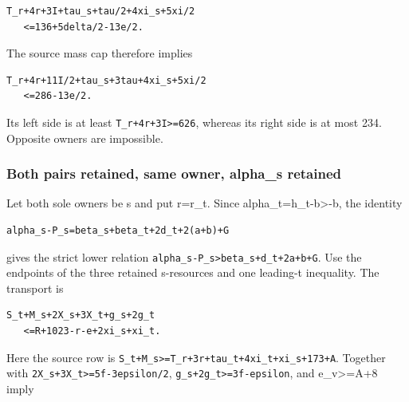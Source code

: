 \documentclass[10pt,a4paper]{article}
\theoremstyle{definition}
\begin{document}
\begin{lstlisting}
T_r+4r+3I+tau_s+tau/2+4xi_s+5xi/2
   <=136+5delta/2-13e/2.
\end{lstlisting}

The source mass cap therefore implies

\begin{lstlisting}
T_r+4r+11I/2+tau_s+3tau+4xi_s+5xi/2
   <=286-13e/2.
\end{lstlisting}

Its left side is at least \texttt{T\_\allowbreak{}\allowbreak{}r+\allowbreak{}4r+\allowbreak{}3I>=\allowbreak{}626},\allowbreak{}
whereas its right side is at most 234. Opposite owners are impossible.

\hypertarget{both-pairs-retained-same-owner-alpha_s-retained}{%
\subsubsection{Both pairs retained,\allowbreak{} same owner,\allowbreak{} alpha\_\allowbreak{}s
retained}\label{both-pairs-retained-same-owner-alpha_s-retained}}

Let both sole owners be s and put r=\allowbreak{}r\_\allowbreak{}t. Since
alpha\_\allowbreak{}t=\allowbreak{}h\_\allowbreak{}t-b\textgreater-b,\allowbreak{} the identity

\begin{lstlisting}
alpha_s-P_s=beta_s+beta_t+2d_t+2(a+b)+G
\end{lstlisting}

gives the strict lower relation
\texttt{alpha\_\allowbreak{}\allowbreak{}s-P\_\allowbreak{}\allowbreak{}s>beta\_\allowbreak{}\allowbreak{}s+\allowbreak{}d\_\allowbreak{}\allowbreak{}t+\allowbreak{}2a+\allowbreak{}b+\allowbreak{}G}. Use the
endpoints of the three retained s-resources and one leading-t
inequality. The transport is

\begin{lstlisting}
S_t+M_s+2X_s+3X_t+g_s+2g_t
   <=R+1023-r-e+2xi_s+xi_t.
\end{lstlisting}

Here the source row is
\texttt{S\_\allowbreak{}\allowbreak{}t+\allowbreak{}M\_\allowbreak{}\allowbreak{}s>=\allowbreak{}T\_\allowbreak{}\allowbreak{}r+\allowbreak{}3r+\allowbreak{}tau\_\allowbreak{}\allowbreak{}t+\allowbreak{}4xi\_\allowbreak{}\allowbreak{}t+\allowbreak{}xi\_\allowbreak{}\allowbreak{}s+\allowbreak{}173+\allowbreak{}A}.
Together with \texttt{2X\_\allowbreak{}\allowbreak{}s+\allowbreak{}3X\_\allowbreak{}\allowbreak{}t>=\allowbreak{}5f-3epsilon/\allowbreak{}2},\allowbreak{}
\texttt{g\_\allowbreak{}\allowbreak{}s+\allowbreak{}2g\_\allowbreak{}\allowbreak{}t>=\allowbreak{}3f-epsilon},\allowbreak{} and
e\_\allowbreak{}v\textgreater=\allowbreak{}A+\allowbreak{}8 imply
\end{document}
